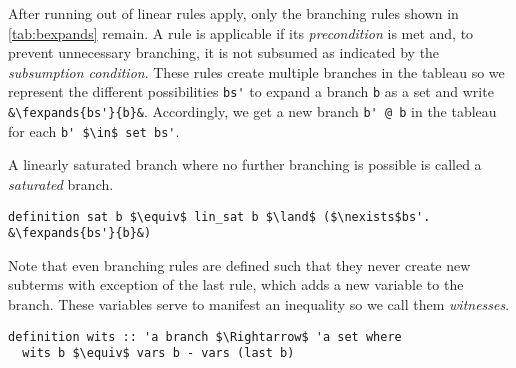 \documentclass[sigplan,10pt,anonymous,review]{acmart}
\newcommand{\lefttrianglebar}{\mathrel{\tikz[baseline]{\draw (1ex, 0.75ex) -- (0, 1.25ex) -- (0, 0.25ex) -- cycle; \draw (0, 0.75ex) -- (1ex, 0.75ex);}}}
\newcommand{\fexpands}[2]{#1 $\lefttrianglebar$ #2}
\newcommand{\inS}{\in_\text{s}}
\newcommand{\notinS}{\notin_\text{s}}
\begin{document}
After running out of linear rules apply, only the branching rules shown in \autoref{tab:bexpands} remain.
A rule is applicable if its \textit{precondition} is met and, to prevent unnecessary branching, it is not subsumed as indicated by the \textit{subsumption condition}.
These rules create multiple branches in the tableau so we represent the different possibilities \lstinline!bs'! to expand a branch \lstinline!b! as a set and write \lstinline!&\fexpands{bs'}{b}&!. 
Accordingly, we get a new branch \lstinline!b' @ b! in the tableau for each \lstinline!b' $\in$ set bs'!.

A linearly saturated branch where no further branching is possible is called a \textit{saturated} branch. 
\begin{lstlisting}
definition sat b $\equiv$ lin_sat b $\land$ ($\nexists$bs'. &\fexpands{bs'}{b}&)
\end{lstlisting}

Note that even branching rules are defined such that they never create new subterms with exception of the last rule, which adds a new variable to the branch.
These variables serve to manifest an inequality so we call them \textit{witnesses}.
\begin{lstlisting}
definition wits :: 'a branch $\Rightarrow$ 'a set where
  wits b $\equiv$ vars b - vars (last b)
\end{lstlisting}
\end{document}

